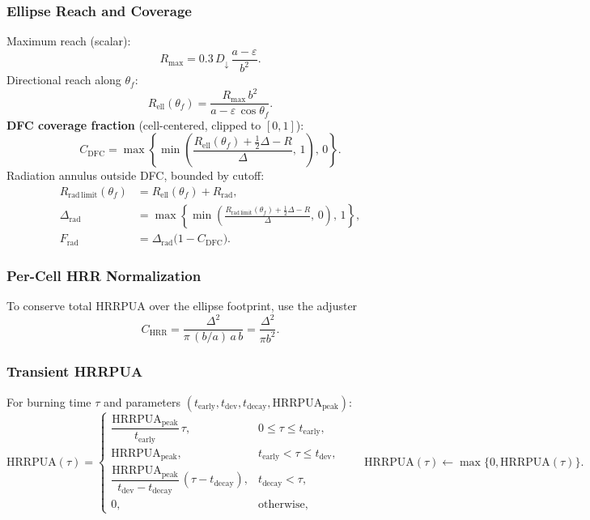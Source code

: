 \documentclass[../report/case_report.tex]{subfiles}
\begin{document}
\subsubsection*{Ellipse Reach and Coverage}
Maximum reach (scalar):
\begin{equation}
  R_{\max}=0.3\,D_\downarrow\,\frac{a-\varepsilon}{b^2}.
\end{equation}
Directional reach along $\theta_f$:
\begin{equation}
  R_{\mathrm{ell}}(\theta_f)=\frac{R_{\max}\,b^2}{a-\varepsilon\,\cos\theta_f}.
\end{equation}
\textbf{DFC coverage fraction} (cell-centered, clipped to $[0,1]$):
\begin{equation}
  C_{\mathrm{DFC}}
  = \max\!\left\{\min\!\left(\frac{R_{\mathrm{ell}}(\theta_f)+\tfrac{1}{2}\Delta - R}{\Delta},\,1\right),\,0\right\}.
\end{equation}
Radiation annulus outside DFC, bounded by cutoff:
\begin{align}
  R_{\mathrm{rad\,limit}}(\theta_f)&=R_{\mathrm{ell}}(\theta_f)+R_{\mathrm{rad}},\\
  \Delta_{\mathrm{rad}}&=\max\!\left\{\min\!\left(\frac{R_{\mathrm{rad\,limit}}(\theta_f)+\tfrac{1}{2}\Delta - R}{\Delta},\,0\right),\,1\right\},\\
  F_{\mathrm{rad}}&=\Delta_{\mathrm{rad}}\bigl(1-C_{\mathrm{DFC}}\bigr). 
\end{align}

\subsubsection*{Per-Cell HRR Normalization}
To conserve total HRRPUA over the ellipse footprint, use the adjuster
\begin{equation}
  C_\mathrm{HRR}=\frac{\Delta^2}{\pi \, (b/a)\, a\, b}
  = \frac{\Delta^2}{\pi b^2}.
\end{equation}

\subsubsection*{Transient HRRPUA}
For burning time $\tau$ and parameters $(t_{\mathrm{early}}, t_{\mathrm{dev}}, t_{\mathrm{decay}}, \mathrm{HRRPUA_{peak}})$:
\begin{equation}
\mathrm{HRRPUA}(\tau)=
\begin{cases}
\dfrac{\mathrm{HRRPUA_{peak}}}{t_{\mathrm{early}}}\,\tau, & 0\le \tau\le t_{\mathrm{early}},\\[6pt]
\mathrm{HRRPUA_{peak}}, & t_{\mathrm{early}}<\tau\le t_{\mathrm{dev}},\\[6pt]
\dfrac{\mathrm{HRRPUA_{peak}}}{t_{\mathrm{dev}}-t_{\mathrm{decay}}}\,(\tau-t_{\mathrm{decay}}), & t_{\mathrm{decay}}<\tau,\\[6pt]
0,& \text{otherwise},
\end{cases}
\qquad \mathrm{HRRPUA}(\tau)\leftarrow \max\{0,\mathrm{HRRPUA}(\tau)\}.
\end{equation}
\end{document}
